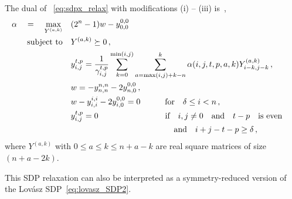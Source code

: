 \documentclass[12pt,a4paper]{amsart}
\newcommand{\nn}{\nonumber}
\begin{document}
The dual of 
~\eqref{eq:sdpx_relax}
with modifications (i) -- (iii) is~\cite{munne2025sdpboundsquantumcodes},
% 
\begin{align}\label{eq:dual_sol}
	\alpha \quad = \quad \max_{Y^{(a,k)}} \quad
	&   (2^n-1)w - y_{0,0}^{0,0} \nn \\
	\text{subject to}  \quad & Y^{(a,k)} \succeq 0\,, \nn \\
	& y^{t,p}_{i,j} = \frac{1}{\gamma^{t,p}_{i,j}}\sum^{\min(i,j)}_{k=0} \sum^k_{a=\max(i,j)+k-n} \alpha(i,j,t,p,a,k) Y^{(a,k)}_{i-k,j-k}\,, \nn \\
    & w = -y_{n,n}^{n,n}  - 2 y_{n,0}^{0,0}\,, \nn \\
	& w-y_{i,i}^{i,i} -2 y_{i,0}^{0,0} = 0
	\quad\quad\quad\text{for} \quad \delta \leq i < n \,, \nn \\
	&  y^{t,p}_{i,j}=0
	\hspace{8em}  \,\text{if} \quad i,j\neq 0 \quad \text{and}\quad t-p \quad  \text{is even } \quad  \nn \\
	&\hspace{11.6em}\quad \text{and} \quad i + j - t - p \geq \delta \,,
\end{align}
where $Y^{(a,k)}$ with $0\leq a\leq k\leq n+a-k$ are real square matrices of size $(n+a-2k)$.

This SDP relaxation can also be interpreted as a symmetry-reduced version of the Lov\'asz SDP~\eqref{eq:lovasz_SDP2}. 
\end{document}
